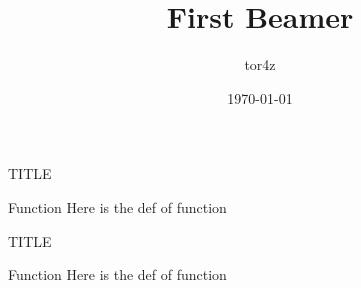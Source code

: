 \documentclass{beamer}
\title{First Beamer}
\author{tor4z}
\date{\today}
\begin{document}


\begin{frame}
\maketitle
\end{frame}

\begin{frame}[t]{TITLE}
\vspace{6pt}
\begin{block}{Function}
	Here is the def of function
\end{block}
\end{frame}

\begin{frame}[t]{TITLE}
\vspace{6pt}
\begin{block}{Function}
	Here is the def of function
\end{block}
\end{frame}
\end{document}
